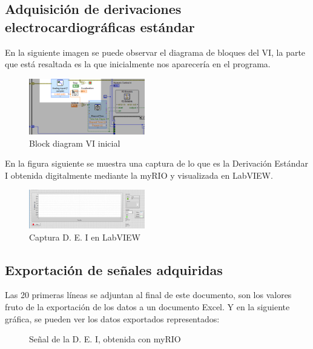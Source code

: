 \documentclass[conference]{IEEEtran}
\begin{document}
\subsection{Adquisición de derivaciones electrocardiográficas estándar}
En la siguiente imagen se puede observar el diagrama de bloques del VI, la parte que está resaltada es la que inicialmente nos aparecería en el programa.
\begin{figure}[H]
    \centerline{\includegraphics[width=0.45\textwidth]{e_diagramVI_inicial.png}}
    \caption{Block diagram VI inicial}
    \end{figure}

En la figura siguiente se muestra una captura de lo que es la Derivación Estándar I obtenida digitalmente mediante la myRIO y visualizada en LabVIEW.
\begin{figure}[H]
    \centerline{\includegraphics[width=0.45\textwidth]{e_captura.png}}
    \caption{Captura D. E. I en LabVIEW}
    \end{figure}

\subsection{Exportación de señales adquiridas}
Las 20 primeras líneas se adjuntan al final de este documento, son los valores fruto de la exportación de los datos a un documento Excel.
Y en la siguiente gráfica, se pueden ver los datos exportados representados:
\begin{figure}[H]
    \caption{Señal de la D. E. I, obtenida con myRIO}
    \label{g_myRIO}
    \end{figure}
\end{document}
